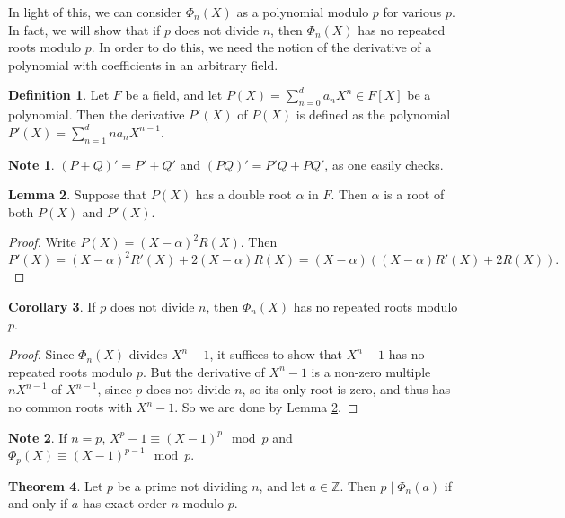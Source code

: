 \documentclass{article}
\newcommand{\Z}{\mathbb{Z}}
\newcommand{\rb}[1]{\left( #1 \right)}
\renewcommand{\sb}[1]{\left[ #1 \right]}
\theoremstyle{definition}\newtheorem{definition}{Definition}
\theoremstyle{definition}\newtheorem{remark}[definition]{Remark}
\theoremstyle{definition}\newtheorem*{example}{Example}
\theoremstyle{definition}\newtheorem*{note}{Note}
\newtheorem{lemma}[definition]{Lemma}
\newtheorem{theorem}[definition]{Theorem}
\newtheorem{corollary}[definition]{Corollary}
\begin{document}
In light of this, we can consider $ \Phi_n\rb{X} $ as a polynomial modulo $ p $ for various $ p $. In fact, we will show that if $ p $ does not divide $ n $, then $ \Phi_n\rb{X} $ has no repeated roots modulo $ p $. In order to do this, we need the notion of the derivative of a polynomial with coefficients in an arbitrary field.

\begin{definition}
Let $ F $ be a field, and let $ P\rb{X} = \sum_{n = 0}^d a_nX^n \in F\sb{X} $ be a polynomial. Then the derivative $ P'\rb{X} $ of $ P\rb{X} $ is defined as the polynomial $ P'\rb{X} = \sum_{n = 1}^d na_nX^{n - 1} $.
\end{definition}

\begin{note}
$ \rb{P + Q}' = P' + Q' $ and $ \rb{PQ}' = P'Q + PQ' $, as one easily checks.
\end{note}

\begin{lemma}
\label{lem:98}
Suppose that $ P\rb{X} $ has a double root $ \alpha $ in $ F $. Then $ \alpha $ is a root of both $ P\rb{X} $ and $ P'\rb{X} $.
\end{lemma}

\begin{proof}
Write $ P\rb{X} = \rb{X - \alpha}^2R\rb{X} $. Then
$$ P'\rb{X} = \rb{X - \alpha}^2R'\rb{X} + 2\rb{X - \alpha}R\rb{X} = \rb{X - \alpha}\rb{\rb{X - \alpha}R'\rb{X} + 2R\rb{X}}. $$
\end{proof}

\begin{corollary}
\label{cor:99}
If $ p $ does not divide $ n $, then $ \Phi_n\rb{X} $ has no repeated roots modulo $ p $.
\end{corollary}

\begin{proof}
Since $ \Phi_n\rb{X} $ divides $ X^n - 1 $, it suffices to show that $ X^n - 1 $ has no repeated roots modulo $ p $. But the derivative of $ X^n - 1 $ is a non-zero multiple $ nX^{n - 1} $ of $ X^{n - 1} $, since $ p $ does not divide $ n $, so its only root is zero, and thus has no common roots with $ X^n - 1 $. So we are done by Lemma \ref{lem:98}.
\end{proof}

\begin{note}
If $ n = p $, $ X^p - 1 \equiv \rb{X - 1}^p \mod p $ and $ \Phi_p\rb{X} \equiv \rb{X - 1}^{p - 1} \mod p $.
\end{note}

\begin{theorem}
\label{thm:100}
Let $ p $ be a prime not dividing $ n $, and let $ a \in \Z $. Then $ p \mid \Phi_n\rb{a} $ if and only if $ a $ has exact order $ n $ modulo $ p $.
\end{theorem}
\end{document}
